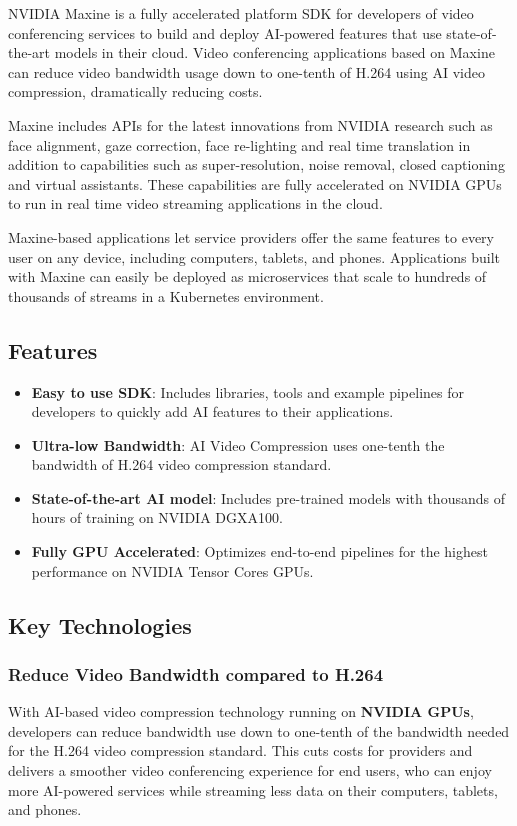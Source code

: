 NVIDIA Maxine is a fully accelerated platform SDK for developers of video 
conferencing services to build and deploy AI-powered features that use state-of-the-art 
models in their cloud. Video conferencing applications based on Maxine can reduce video 
bandwidth usage down to one-tenth of H.264 using AI video compression, dramatically reducing costs.

Maxine includes APIs for the latest innovations from NVIDIA research such as face alignment, 
gaze correction, face re-lighting and real time translation in addition to capabilities such 
as super-resolution, noise removal, closed captioning and virtual assistants. These capabilities are 
fully accelerated on NVIDIA GPUs to run in real time video streaming applications in the cloud.

Maxine-based applications let service providers offer the same features to every user on any device,
including computers, tablets, and phones. Applications built with Maxine can easily be deployed as 
microservices that scale to hundreds of thousands of streams in a Kubernetes environment.~\cite{Maxine}

\subsection{Features}

\begin{itemize}
    \item \textbf{Easy to use SDK}: Includes libraries, tools and example pipelines 
    for developers to quickly add AI features to their applications.
    \item \textbf{Ultra-low Bandwidth}: AI Video Compression uses one-tenth the 
    bandwidth of H.264 video compression standard.
    \item \textbf{State-of-the-art AI model}: Includes pre-trained models with thousands of hours 
    of training on NVIDIA DGX\texttrademark A100.
    \item \textbf{Fully GPU Accelerated}: Optimizes end-to-end pipelines for the highest performance 
    on NVIDIA Tensor Cores GPUs.
\end{itemize}

\subsection{Key Technologies}

\subsubsection{Reduce Video Bandwidth compared to H.264}
With AI-based video compression technology running on \textbf{NVIDIA GPUs}, 
developers can reduce bandwidth use down to one-tenth of the bandwidth needed 
for the H.264 video compression standard. This cuts costs for providers and 
delivers a smoother video conferencing experience for end users, who can enjoy 
more AI-powered services while streaming less data on their computers, tablets, and phones.

